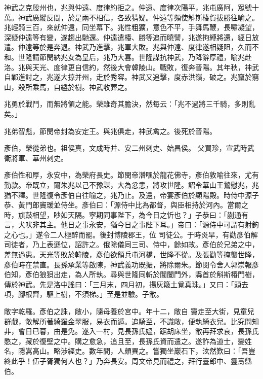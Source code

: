 \begin{pinyinscope}
 神武之克殷州也，兆與仲遠、度律約拒之。仲遠、度律次陽平，兆屯廣阿，眾號十萬。神武廣縱反間，於是兩不相信，各致猜疑。仲遠等頻使斛斯椿賀拔勝往喻之。兆輕騎三百，來就仲遠，同坐幕下。兆性粗獷，意色不平，手舞馬鞭，長嘯凝望，深疑仲遠等有變，遂趨出馳還。仲遠遣椿、勝等追而曉譬，兆遂拘縛將還，經日放
 遣。仲遠等於是奔退。神武乃進擊，兆軍大敗。兆與仲遠、度律遂相疑阻，久而不和。世隆請節閔納兆女為皇后，兆乃大喜。世隆謀抗神武，乃降辭厚禮，喻兆赴洛。兆與天光、度律更自信約，然後大會韓陵山。戰敗，復奔晉陽。其年秋，神武自鄴進討之，兆遂大掠并州，走於秀容。神武又追擊，度赤洪嶺，破之。兆竄於窮山，殺所乘馬，自縊於樹。神武收葬之。



 兆勇於戰鬥，而無將領之能。榮雖奇其膽決，然每云：「兆不過將三千騎，多則亂矣。」



 兆弟智彪，節閔帝封為安定王。與兆俱走，神武禽之。後死於晉陽。



 彥伯，榮從弟也。祖侯真，文成時并、安二州刺史、始昌侯。
 父買珍，宣武時武衛將軍、華州刺史。



 彥伯性和厚，永安中，為榮府長史。節閔帝潛嘿於龍花佛寺，彥伯敦喻往來，尤有勤款。帝既立，爾朱兆以己不豫謀，大為忿恚，將攻世隆。詔令華山王鷙慰兆，兆猶不釋。世隆復令彥伯自往喻之，兆乃止。及還，帝宴彥伯於顯陽殿。時侍中源子恭、黃門郎竇瑗並侍坐。彥伯曰：「源侍中比為都督，與臣相持於河內。當爾之時，旗鼓相望，眇如天隔。寧期同事陛下，為今日之忻也？」子恭曰：「蒯通有言，犬吠非其主。他日之事永安，猶今日之事陛下耳。」帝曰：「源侍中可謂有射鉤之心也。」遂令二人極醉而罷。後封博陵郡王，位
 司徒公。于時炎旱，有勸彥伯解司徒者，乃上表遜位，詔許之。俄除儀同三司、侍中，餘如故。彥伯於兄弟之中，差無過患。天光等敗於韓陵，彥伯欲領兵屯河橋，世隆不從。及張勸等掩襲世隆，彥伯時在禁直。長孫承業等啟陳，神武義功既振，將除爾朱。節閔令舍人郭崇報彥伯知，彥伯狼狽出走，為人所執。尋與世隆同斬於閶闔門外，縣首於斛斯椿門樹，傳於神武。先是洛中謠曰：「三月末，四月初，揚灰簸土覓真珠。」又曰：「頭去項，腳根齊，驅上樹，不須梯。」至是並驗。子敞。



 敞字乾羅。彥伯之誅，敞小，隨母養於宮中。年十二，敞自
 竇走至大街，見童兒群戲，敞解所著綺羅金翠服，易衣而遁。追騎至，不識敞，便執綺衣兒。比究問知非，會日已暮，由是免。遂入一村，見長孫氏媼，踞胡床坐，敞再拜求哀，長孫氏愍之，藏於復壁之中。購之愈急，追且至，長孫氏資而遣之。遂詐為道士，變姓名，隱嵩高山。略涉經史。數年間，人頗異之。嘗獨坐巖石下，泫然歎曰：「吾豈終此乎！伍子胥獨何人也？」乃奔長安。周文帝見而禮之，拜行臺郎中、靈壽縣伯。




\end{pinyinscope}
